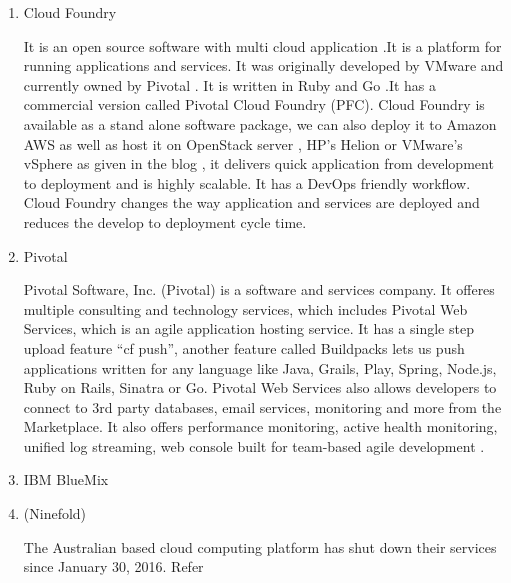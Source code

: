\begin{enumerate}
\item {} 
Cloud Foundry

It is an open source software with multi cloud application .It is
a platform for running applications and
services. \label{\detokenize{i524/technologies:id182}}{\hyperref[\detokenize{i524/technologies:www-cloudfoundry-book}]{\sphinxcrossref{{[}156{]}}}} It was originally
developed by VMware and currently owned by Pivotal . It is written
in Ruby and Go .It has a commercial version called Pivotal Cloud
Foundry (PFC). Cloud Foundry is available as a stand alone
software package, we can also deploy it to Amazon AWS as well as
host it on OpenStack server , HP’s Helion or VMware’s vSphere as
given in the blog \label{\detokenize{i524/technologies:id183}}{\hyperref[\detokenize{i524/technologies:www-cloudfoundry-blog}]{\sphinxcrossref{{[}157{]}}}} , it delivers
quick application from development to deployment and is highly
scalable. It has a DevOps friendly workflow.  Cloud Foundry
changes the way application and services are deployed and reduces
the develop to deployment cycle time.

\item {} 
Pivotal

Pivotal Software, Inc. (Pivotal) is a software and services
company. It offeres multiple consulting and technology services,
which includes Pivotal Web Services, which is an agile application
hosting service. It has a single step upload feature ``cf push'',
another feature called Buildpacks lets us push applications
written for any language like Java, Grails, Play, Spring, Node.js,
Ruby on Rails, Sinatra or Go. Pivotal Web Services also allows
developers to connect to 3rd party databases, email services,
monitoring and more from the Marketplace. It also offers
performance monitoring, active health monitoring, unified log
streaming, web console built for team-based agile development
\label{\detokenize{i524/technologies:id184}}{\hyperref[\detokenize{i524/technologies:pivotal-www}]{\sphinxcrossref{{[}158{]}}}}.

\item {} 
IBM BlueMix

\item {} 
(Ninefold)

The Australian based cloud computing platform has shut down their
services since January 30, 2016. Refer \label{\detokenize{i524/technologies:id185}}{\hyperref[\detokenize{i524/technologies:www-ninefoldsite}]{\sphinxcrossref{{[}159{]}}}}


\end{enumerate}
